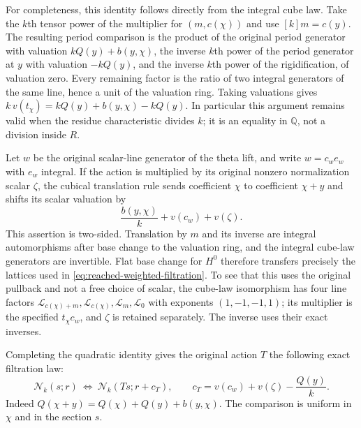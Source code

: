 For completeness, this identity follows directly from the integral
cube law.  Take the $k$th tensor power of the multiplier for $(m,c(\chi))$
and use $[k]m=c(y)$.  The resulting period comparison is the product of
the original period generator with valuation
$kQ(y)+b(y,\chi)$, the inverse $k$th power of the period generator at
$y$ with valuation $-kQ(y)$, and the inverse $k$th power of the
rigidification, of valuation zero.  Every remaining factor is the
ratio of two integral generators of the same line, hence a unit of the
valuation ring.  Taking valuations gives
$k\,v(t_\chi)=kQ(y)+b(y,\chi)-kQ(y)$.
In particular this argument remains valid when the residue
characteristic divides $k$; it is an equality in $\mathbb Q$, not a
division inside $R$.

Let $w$ be the original scalar-line generator of the theta lift, and
write $w=c_w e_w$ with $e_w$ integral.  If the action is multiplied by
its original nonzero normalization scalar $\zeta$, the cubical
translation rule sends coefficient $\chi$ to coefficient $\chi+y$ and
shifts its scalar valuation by
\[
            \frac{b(y,\chi)}{k}+v(c_w)+v(\zeta).
\]
This assertion is two-sided.  Translation by $m$ and its inverse are
integral automorphisms after base change to the valuation ring, and
the integral cube-law generators are invertible.  Flat base change
for $H^0$ therefore transfers precisely the lattices used in
\eqref{eq:reached-weighted-filtration}.  To see that this uses the
original pullback and not a free choice of scalar, the cube-law
isomorphism has four line factors
$\mathscr L_{c(\chi)+m},\mathscr L_{c(\chi)},\mathscr L_m,
\mathscr L_0$ with exponents $(1,-1,-1,1)$; its multiplier is the
specified $t_\chi c_w$, and $\zeta$ is retained separately.
The inverse uses their exact inverses.

Completing the quadratic identity gives the original action $T$ the
following exact filtration law:
\begin{equation}\label{eq:reached-exact-translation-shift}
 \mathcal N_k(s;r)\ \Longleftrightarrow\
 \mathcal N_k(Ts;r+c_T),\qquad
 c_T=v(c_w)+v(\zeta)-\frac{Q(y)}k.
\end{equation}
Indeed
$Q(\chi+y)=Q(\chi)+Q(y)+b(y,\chi)$.
The comparison is uniform in $\chi$ and in the section $s$.

